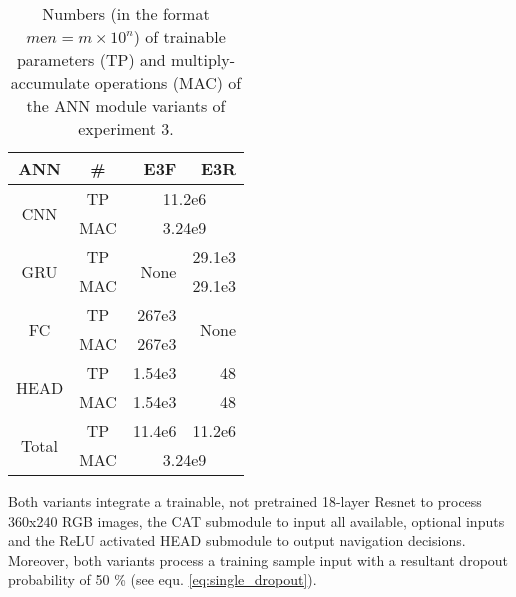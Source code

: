 \providecommand{\ncols}{}\renewcommand{\ncols}{4}
\begin{table}[h]
    \caption[
        Numbers of trainable parameters 
        and multiply-accumulate operations
        of the ANN module variants of experiment 3
    ]{
        Numbers (in the format $m\text{e}n = m\times 10^n$) of trainable parameters (TP)
        and multiply-accumulate operations (MAC)
        of the ANN module variants of experiment 3.
        \label{tab:exp3_nums}}        
    \centering
    \begin{tabular}{|c|c|r|r|} 
        \hline
        ANN
        &\#
        &E3F
        &E3R
        \\\hline
        \multirow{2}{*}{CNN}
        &TP
        &\multicolumn{2}{c|}{11.2e6}
        \\\cline{2-\ncols}
        &MAC
        &\multicolumn{2}{c|}{3.24e9}
        \\\hline
        \multirow{2}{*}{GRU}
        &TP
        &\multirow{2}{*}{None}
        &29.1e3
        \\\cline{2-2}\cline{4-\ncols}
        &MAC
        &
        &29.1e3
        \\\hline
        \multirow{2}{*}{FC}
        &TP
        &267e3
        &\multirow{2}{*}{None}
        \\\cline{2-3}
        &MAC
        &267e3
        &
        \\\hline
        \multirow{2}{*}{HEAD}
        &TP
        &1.54e3
        &48
        \\\cline{2-\ncols}
        &MAC
        &1.54e3
        &48
        \\\hline
        \multirow{2}{*}{Total}
        &TP
        &11.4e6
        &11.2e6
        \\\cline{2-\ncols}
        &MAC
        &\multicolumn{2}{c|}{3.24e9}
        \\\hline
    \end{tabular}
\end{table}

Both variants integrate a trainable,
not pretrained 18-layer Resnet
to process 360x240 RGB images,
the CAT submodule to input 
all available, optional inputs
and the ReLU activated HEAD submodule 
to output navigation decisions.
Moreover, both variants process a training sample 
input with a resultant dropout probability of 
50 \% (see equ. \ref{eq:single_dropout}).

